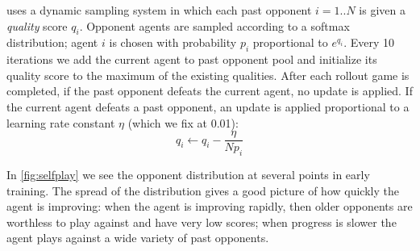 \documentclass[ocean-paper.tex]{subfiles}
\begin{document}
\openaifive uses a dynamic sampling system in which each past opponent $i=1..N$ is given a {\it quality} score $q_i$. 
Opponent agents are sampled according to a softmax distribution; agent $i$ is chosen with probability $p_i$ proportional to $e^{q_i}$.
Every 10 iterations we add the current agent to past opponent pool and initialize its quality score to the maximum of the existing qualities.
After each rollout game is completed, if the past opponent defeats the current agent, no update is applied. If the current agent defeats a past opponent, an update is applied proportional to a learning rate constant $\eta$ (which we fix at 0.01):
\begin{equation}
    q_i \leftarrow q_i - \frac{\eta}{N p_i}
\end{equation}


In \autoref{fig:selfplay} we see the opponent distribution at several points in early training. 
The spread of the distribution gives a good picture of how quickly the agent is improving: when the agent is improving rapidly, then older opponents are worthless to play against and have very low scores; when progress is slower the agent plays against a wide variety of past opponents.
\end{document}
